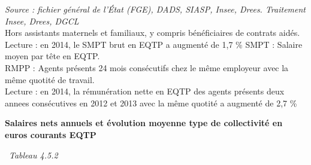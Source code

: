 \emph{Source : fichier général de l'État (FGE), DADS, SIASP, Insee,
Drees. Traitement Insee, Drees, DGCL}\\
Hors assistants maternels et familiaux, y compris bénéficiaires de
contrats aidés.\\
Lecture : en 2014, le SMPT brut en EQTP a augmenté de 1,7 \% SMPT :
Salaire moyen par tête en EQTP.\\
RMPP : Agents présents 24 mois consécutifs chez le même employeur avec
la même quotité de travail.\\
Lecture : en 2014, la rémunération nette en EQTP des agents présents
deux annees consécutives en 2012 et 2013 avec la même quotité a augmenté
de 2,7 \%

\textbf{Salaires nets annuels et évolution moyenne type de collectivité
en euros courants EQTP}

~\emph{Tableau 4.5.2}

